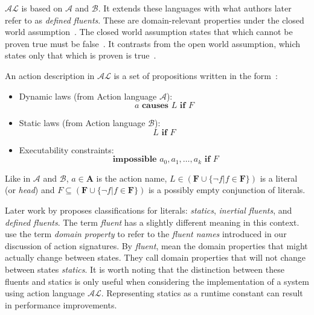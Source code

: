 $\mathcal{AL}$ is based on $\mathcal{A}$ and $\mathcal{B}$.
It extends these languages with what authors later refer to as \textit{defined fluents}.
These are domain-relevant properties under the closed world assumption~\citep{blount_architecture_2013}.
The closed world assumption states that which cannot be proven true must be false~\citep{reiter_closed_1981}.
It contrasts from the open world assumption, which states only that which is proven is true~\citep{reiter_closed_1981}.

An action description in $\mathcal{AL}$ is a set of propositions written in the form~\citep{baral_reasoning_2000, blount_architecture_2013}:

\begin{itemize}
    \item Dynamic laws (from Action language $\mathcal{A}$):
        \begin{equation}
            a \textbf{ causes } L \textbf{ if } F
        \end{equation}

    \item Static laws (from Action language $\mathcal{B}$):
        \begin{equation}
            L \textbf{ if } F
        \end{equation}

    \item Executability constraints:
        \begin{equation}
            \textbf{ impossible } a_0, a_1, \dots, a_k \textbf{ if } F
        \end{equation}
\end{itemize}

Like in $\mathcal{A}$ and $\mathcal{B}$, $a \in \boldsymbol{A}$ is the action name, $L \in(\boldsymbol{F} \cup\{\neg f | f \in \boldsymbol{F}\}) $ is a literal (or \textit{head}) and $F \subseteq(\boldsymbol{F} \cup\{\neg f | f \in \boldsymbol{F}\})$ is a possibly empty conjunction of literals.

Later work by \citet{gelfond_knowledge_2014} proposes classifications for literals: \textit{statics}, \textit{inertial fluents}, and \textit{defined fluents}.
The term \textit{fluent} has a slightly different meaning in this context.
\citet{gelfond_knowledge_2014} use the term \textit{domain property} to refer to the \textit{fluent names} introduced in our discussion of action signatures.
By \textit{fluent}, \citet{gelfond_knowledge_2014} mean the domain properties that might actually change between states.
They call domain properties that will not change between states \textit{statics}.
It is worth noting that the distinction between these fluents and statics is only useful when considering the implementation of a system using action language $\mathcal{AL}$.
Representing statics as a runtime constant can result in performance improvements.

